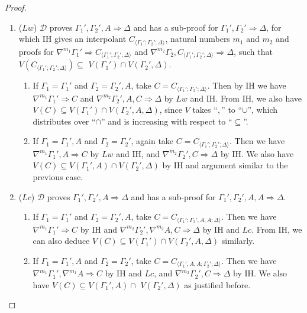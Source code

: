 \begin{proof}
\begin{enumerate}
		\item ($Lw$) $\mathcal{D}$ proves $\Gamma_1' , \Gamma_2' , A \Rightarrow \Delta$ and has a sub-proof for $\Gamma_1' , \Gamma_2' \Rightarrow \Delta$, for which IH gives an interpolant $C_{\langle\Gamma_1';\Gamma_2';\Delta\rangle}$, natural numbers $m_1$ and $m_2$ and proofs for $\nabla^{m_1} \Gamma_1' \Rightarrow C_{\langle\Gamma_1';\Gamma_2';\Delta\rangle}$ and $\nabla^{m_2} \Gamma_2 , C_{\langle\Gamma_1';\Gamma_2';\Delta\rangle} \Rightarrow \Delta$, such that $V(C_{\langle\Gamma_1';\Gamma_2';\Delta\rangle}) \subseteq$ $ V(\Gamma_1') \cap V(\Gamma_2' , \Delta)$.
		\begin{enumerate}
			\item If $\Gamma_1 = \Gamma_1'$ and $\Gamma_2 = \Gamma_2' , A$, take $C = C_{\langle\Gamma_1';\Gamma_2';\Delta\rangle}$. Then by IH we have  $\nabla^{m_1} \Gamma_1' \Rightarrow C$ and $\nabla^{m_2} \Gamma_2' , A , C \Rightarrow \Delta$ by $Lw$ and IH. From IH, we also have $V(C) \subseteq V(\Gamma_1') \cap V(\Gamma_2' , A , \Delta)$, since $V$ takes ``$,$'' to ``$\cup$'', which distributes over ``$\cap$'' and is increasing with respect to ``$\subseteq$''.

			\item If $\Gamma_1 = \Gamma_1' , A$ and $\Gamma_2 = \Gamma_2'$, again take $C = C_{\langle\Gamma_1';\Gamma_2';\Delta\rangle}$. Then we have  $\nabla^{m_1} \Gamma_1' , A \Rightarrow C$ by $Lw$ and IH, and $\nabla^{m_2} \Gamma_2' , C \Rightarrow \Delta$ by IH. We also have $V(C) \subseteq V(\Gamma_1' , A) \cap V(\Gamma_2' , \Delta)$ by IH and argument similar to the previous case.
		\end{enumerate}

		\item ($Lc$) $\mathcal{D}$ proves $\Gamma_1' , \Gamma_2' , A \Rightarrow \Delta$ and has a sub-proof for $\Gamma_1' , \Gamma_2' , A , A \Rightarrow \Delta$.
		\begin{enumerate}
			\item If $\Gamma_1 = \Gamma_1'$ and $\Gamma_2 = \Gamma_2' , A$, take $C = C_{\langle\Gamma_1';\Gamma_2',A,A;\Delta\rangle}$. Then we have $\nabla^{m_1} \Gamma_1' \Rightarrow C$ by IH and $\nabla^{m_2}\Gamma_2' , \nabla^{m_2} A , C \Rightarrow \Delta$ by IH and $Lc$. From IH, we can also deduce $V(C) \subseteq V(\Gamma_1') \cap V(\Gamma_2',A,\Delta)$ similarly.
			
			\item If $\Gamma_1 = \Gamma_1' , A$ and $\Gamma_2 = \Gamma_2'$, take $C = C_{\langle\Gamma_1',A,A;\Gamma_2';\Delta\rangle}$. Then we have $\nabla^{m_1} \Gamma_1', \nabla^{m_1} A \Rightarrow C$ by IH and $Lc$, and $\nabla^{m_2} \Gamma_2' , C \Rightarrow \Delta$ by IH. We also have $V(C) \subseteq V(\Gamma_1',A) \cap$ $V(\Gamma_2',\Delta)$ as justified before.
		\end{enumerate}


\end{enumerate}
\end{proof}
